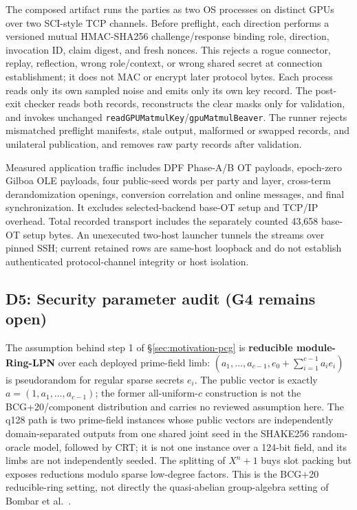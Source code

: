 \documentclass[11pt]{article}
\begin{document}
The composed artifact runs the parties as two OS processes on distinct GPUs
over two SCI-style TCP channels. Before preflight, each direction performs a
versioned mutual HMAC-SHA256 challenge/response binding role, direction,
invocation ID, claim digest, and fresh nonces. This rejects a rogue connector,
replay, reflection, wrong role/context, or wrong shared secret at connection
establishment; it does not MAC or encrypt later protocol bytes. Each process
reads only its own sampled noise and emits only its own key record. The post-exit
checker reads both records, reconstructs the clear masks only for validation,
and invokes unchanged
\texttt{readGPUMatmulKey}/\texttt{gpuMatmulBeaver}. The runner rejects
mismatched preflight manifests, stale output, malformed or swapped records,
and unilateral publication, and removes raw party records after validation.

Measured application traffic includes DPF Phase-A/B OT payloads, epoch-zero
Gilboa OLE payloads, four public-seed words per party and layer, cross-term
derandomization openings, conversion correlation and online messages, and
final synchronization. It excludes selected-backend base-OT setup and TCP/IP
overhead. Total recorded transport includes the separately counted 43{,}658
base-OT setup bytes. An unexecuted two-host launcher tunnels the streams over
pinned SSH; current retained rows are same-host loopback and do not establish
authenticated protocol-channel integrity or host isolation.

\subsection{D5: Security parameter audit (G4 remains open)}
\label{sec:design-params}

The assumption behind step 1 of \S\ref{sec:motivation-pcg} is
\textbf{reducible module-Ring-LPN} over each deployed prime-field limb:
$(a_1,\ldots,a_{c-1},e_0+\sum_{i=1}^{c-1}a_i e_i)$ is pseudorandom for
regular sparse secrets $e_i$. The public vector is exactly
$a=(1,a_1,\ldots,a_{c-1})$; the former all-uniform-$c$ construction is not the
BCG+20/component distribution and carries no reviewed assumption here.
The q128 path is two prime-field instances whose public vectors are
independently domain-separated outputs from one shared joint seed in the
SHAKE256 random-oracle model, followed by CRT; it is not one instance over a
124-bit field, and its limbs are not independently seeded.
The splitting of $X^n+1$ buys slot packing but exposes reductions modulo
sparse low-degree factors. This is the BCG+20 reducible-ring setting, not
directly the quasi-abelian group-algebra setting of
Bombar et al.~\cite{bombar2023quasiabelian}.
\end{document}
